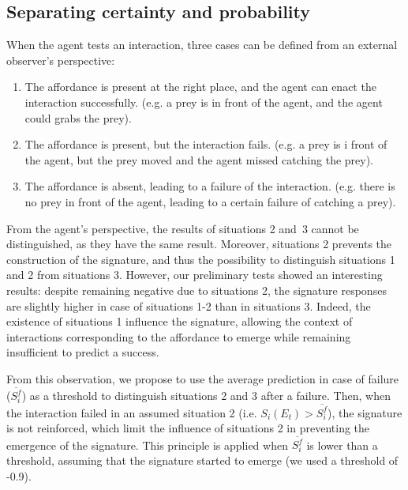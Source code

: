 \documentclass[conference]{IEEEtran}
\begin{document}


\subsection{Separating certainty and probability}\label{AA}

When the agent tests an interaction, three cases can be defined from an external observer's perspective:
\begin{enumerate}
\item The affordance is present at the right place, and the agent can enact the interaction successfully. (e.g. a prey is in front of the agent, and the agent could grabs the prey).
\item The affordance is present, but the interaction fails. (e.g. a prey is i front of the agent, but the prey moved and the agent missed catching the prey).
\item The affordance is absent, leading to a failure of the interaction. (e.g. there is no prey in front of the agent, leading to a certain failure of catching a prey).
\end{enumerate}
From the agent's perspective, the results of situations 2 and~3 cannot be distinguished, as they have the same result. Moreover, situations 2 prevents the construction of the signature, and thus the possibility to distinguish situations 1 and 2 from situations 3.
However, our preliminary tests showed an interesting results: despite remaining negative due to situations 2, the signature responses are slightly higher in case of situations 1-2 than in situations 3. Indeed, the existence of situations 1 influence the signature, allowing the context of interactions corresponding to the affordance to emerge while remaining insufficient to predict a success.

From this observation, we propose to use the average prediction in case of failure ($\overline{S_i^f}$) as a threshold to distinguish situations 2 and 3 after a failure. Then, when the interaction failed in an assumed situation 2 (i.e. $S_i(E_t)>\overline{S_i^f}$), the signature is not reinforced, which limit the influence of situations 2 in preventing the emergence of the signature. This principle is applied when $\overline{S_i^f}$ is lower than a threshold, assuming that the signature started to emerge (we used a threshold of -0.9).
\end{document}
